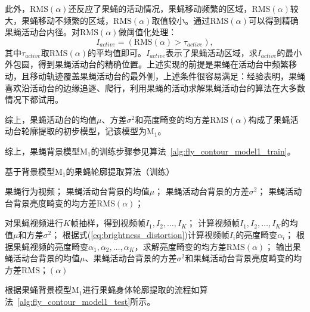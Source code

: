 此外，$\textrm{RMS}(\alpha)$还反应了果蝇的活动情况，果蝇移动频繁的区域，$\textrm{RMS}(\alpha)$较大，果蝇移动不频繁的区域，$\textrm{RMS}(\alpha)$取值较小。通过$\textrm{RMS}(\alpha)$可以得到精确果蝇活动台内径\cite{chexiangqian}。对$\textrm{RMS}(\alpha)$做阈值化处理：
\begin{equation}
I_{active} = \left( \textrm{RMS}(\alpha) > \tau_{active} \right),
\end{equation}
其中$\tau_{active}$取$\textrm{RMS}(\alpha)$的平均值即可。$I_{active}$表示了果蝇活动区域，求$I_{active}$的最小外包圆，得到果蝇活动台的精确位置。上述实现的前提是果蝇在活动台中频繁移动，且移动轨迹覆盖果蝇活动台的最外侧，上述条件很容易满足：经验表明，果蝇喜欢沿活动台的边缘追逐、爬行，利用果蝇的活动求解果蝇活动台的算法在大多数情况下都试用。

综上，果蝇活动台的均值$\mu$、方差$\sigma^2$和亮度畸变的均方差$\textrm{RMS}(\alpha)$构成了果蝇活动台轮廓提取的初步模型，记该模型为$\textrm{M}_1$。

综上，果蝇背景模型$\textrm{M}_1$的训练步骤参见算法~\ref{alg:fly_contour_model1_train}。

\begin{algorithm}
\caption{基于背景模型$\textrm{M}_1$的果蝇轮廓提取算法（训练）}
\label{alg:fly_contour_model1_train}
\begin{algorithmic}[1]
\INPUT
    \Statex 果蝇行为视频；
\OUTPUT
    \Statex 果蝇活动台背景的均值$\mu$；
    \Statex 果蝇活动台背景的方差$\sigma^{2}$；
    \Statex 果蝇活动台背景亮度畸变的均方差$\textrm{RMS}(\alpha)$；

\State 对果蝇视频进行$K$帧抽样，得到视频帧$I_{1}, I_{2}, \ldots, I_{K}$；
\State 计算视频帧$I_{1}, I_{2}, \ldots, I_{K}$的均值$\mu$和方差$\sigma^2$；
    \State 根据式(\ref{eq:brightness_distortion})计算视频帧$I_{i}$的亮度畸变$\alpha_i$；
\EndFor
\State 根据果蝇视频的亮度畸变$\alpha_1, \alpha_2, \ldots, \alpha_K$，求解亮度畸变的均方差$\textrm{RMS}(\alpha)$；
\State 输出果蝇活动台背景的均值$\mu$、果蝇活动台背景的方差$\sigma^{2}$和果蝇活动台背景亮度畸变的均方差$\textrm{RMS}；(\alpha)$
\end{algorithmic}
\end{algorithm}

根据果蝇背景模型$\textrm{M}_1$进行果蝇身体轮廓提取的流程如算法~\ref{alg:fly_contour_model1_test}所示。

